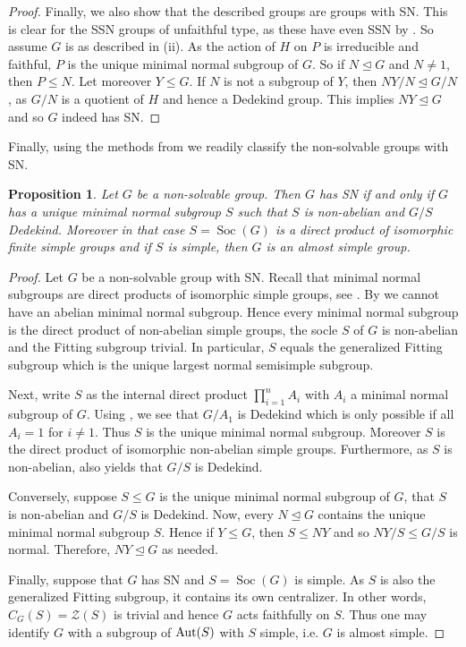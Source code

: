 \documentclass[a4paper,10pt]{amsart}
\newtheorem{proposition}[lemma]{Proposition}
\theoremstyle{definition}
\theoremstyle{remark}
\newcommand\Aut{{\rm Aut}}
\newcommand\Soc{\operatorname{Soc}}
\begin{document}
\begin{proof}
Finally, we also show that the described groups are groups with SN. This is clear for the SSN groups of unfaithful type, as these have even SSN by \cite[Theorem 2.7]{LiuPassman16}. So assume $G$ is as described in (ii). As the action of $H$ on $P$ is irreducible and faithful, $P$ is the unique minimal normal subgroup of $G$. So if $N \unlhd G$ and $N \neq 1$, then $P \leq N$. Let moreover $Y \leq G$. If $N$ is not a subgroup of $Y$, then $NY/N \unlhd G/N$, as $G/N$ is a quotient of $H$ and hence a Dedekind group. This implies $NY \unlhd G$ and so $G$ indeed has SN. 
\end{proof}

Finally, using the methods from \cite[section 3]{LiuPassman16} we readily classify the non-solvable groups with SN.

\begin{proposition}\label{prop:NonSolvableSNGroups}
Let $G$ be a non-solvable group. Then $G$ has SN if and only if $G$ has a unique minimal normal subgroup $S$ such that $S$ is non-abelian and $G/S$ Dedekind. Moreover in that case $S = \Soc(G)$ is a direct product of isomorphic finite simple groups and if $S$ is simple, then $G$ is an almost simple group.
\end{proposition}
\begin{proof}
Let $G$ be a non-solvable group with SN. Recall that minimal normal subgroups are direct products of isomorphic simple groups, see \cite[(8.3)]{Aschbacher}. By  we cannot have an abelian minimal normal subgroup. Hence every minimal normal subgroup is the direct product of non-abelian simple groups, the socle $S$ of $G$ is non-abelian and the Fitting subgroup trivial. In particular, $S$ equals the generalized Fitting subgroup which is the unique largest normal semisimple subgroup.

Next, write $S$ as the internal direct product $\prod_{i=1}^n A_i$ with $A_i$ a minimal normal subgroup of $G$. Using , we see that $G/A_1$
is Dedekind which is only possible if all $A_i=1$ for $i \neq 1$. Thus $S$ is the unique minimal normal subgroup. Moreover $S$ is the direct product of isomorphic non-abelian simple groups. Furthermore, as $S$ is non-abelian,  also yields that $G /S$ is Dedekind.

Conversely, suppose $S \leq G $ is the unique minimal normal subgroup of $G$, that $S$ is non-abelian and $G/S$ is Dedekind. Now, every $N \unlhd G$ contains the unique minimal normal subgroup $S$. Hence if $Y \leq G$, then $S \leq NY$ and so $NY / S \leq G/S$ is normal. Therefore, $NY \unlhd G$ as needed.

Finally, suppose that $G$ has SN and $S = \Soc(G)$ is simple. As $S$ is also the generalized Fitting subgroup, it contains its own centralizer. In other words, $C_G(S) = \mathcal{Z}(S)$ is trivial and hence $G$ acts faithfully on $S$. Thus one may identify $G$ with a subgroup of $\Aut (S)$ with $S$ simple, i.e. $G$ is almost simple. 
\end{proof}
\end{document}
